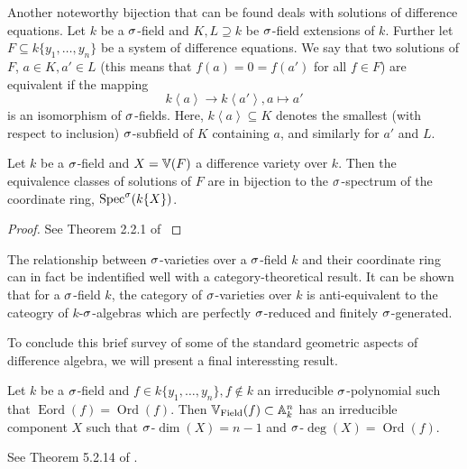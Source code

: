 Another noteworthy bijection that can be found deals with solutions of difference equations.
Let $k$ be a $\sigma$-field and $K,L \supseteq k$ be $\sigma$-field extensions of $k$. Further let $F \subseteq k\{y_1,\ldots,y_n\}$ be a system of difference equations. We say that two solutions of $F$, $a \in K, a' \in L$ (this means that $f(a) = 0 = f(a')$ for all $f \in F$) are equivalent if the mapping $$k\left<a\right> \rightarrow k\left<a'\right>, a \mapsto a'$$ is an isomorphism of $\sigma$-fields. Here, $k\left< a \right> \subseteq K$ denotes the smallest (with respect to inclusion) $\sigma$-subfield of $K$ containing $a$, and similarly for $a'$ and $L$.

\begin{prop}
Let $k$ be a $\sigma$-field and $X = \mathbb{V}(F)$ a difference variety over $k$. Then the equivalence classes of solutions of $F$
are in bijection to the $\sigma$-spectrum of the coordinate ring, $\operatorname{Spec}^\sigma(k\{X\})$.
\begin{proof} See Theorem 2.2.1 of \cite{wibmer}
\end{proof}
\end{prop}

The relationship between $\sigma$-varieties over a $\sigma$-field $k$ and their coordinate ring can in fact be indentified well with a category-theoretical result.
It can be shown that for a $\sigma$-field $k$, the category of $\sigma$-varieties over $k$ is anti-equivalent to the cateogry of $k$-$\sigma$-algebras which are perfectly $\sigma$-reduced and finitely $\sigma$-generated.

To conclude this brief survey of some of the standard geometric aspects of difference algebra, we will present a final interessting result.

\begin{theorem}\label{irredcomp}
Let $k$ be a $\sigma$-field and $f \in k\{y_1,\ldots,y_n\}, f \notin k$ an irreducible $\sigma$-polynomial such that $\operatorname{Eord}(f) = \operatorname{Ord}(f)$. Then $\mathbb{V}_{\operatorname{Field}}(f) \subset \mathbb{A}_k^n$ has an irreducible component $X$ such that $\sigma$-$\dim(X) = n-1$ and $\sigma$-$\operatorname{deg}(X) = \operatorname{Ord}(f)$.
\begin{bew}
See Theorem 5.2.14 of \cite{wibmer}.
\end{bew}
\end{theorem}
